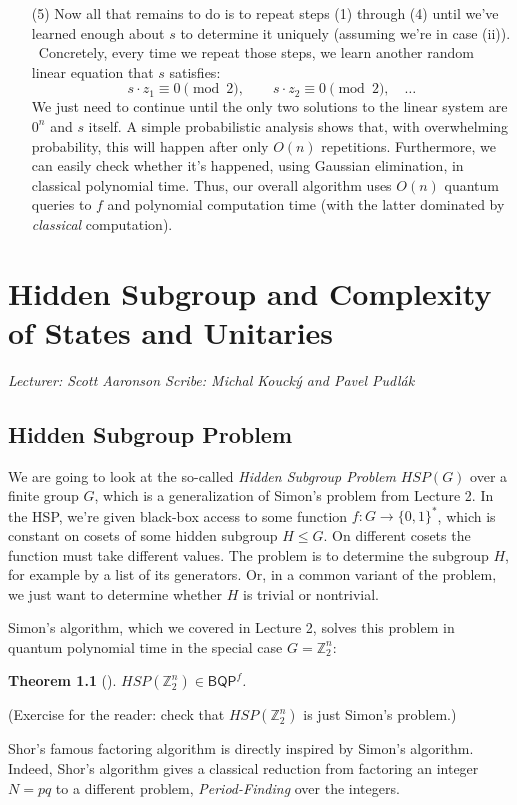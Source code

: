 \documentclass[12pt]{report}
\theoremstyle{plain}
\newtheorem{theorem}{Theorem}[section]
\theoremstyle{definition}
\newcommand{\Z}{{\mathbb Z}}
\newcommand{\lecture}[3]{%
  \chapter{#3}%
  \vspace{-5ex}%
  \textit{Lecturer: #1 \hfill Scribe: #2}\par%
  \vspace{1ex}\titlerule\vspace{2ex}}
\begin{document}
\begin{enumerate}
\item[(5)] Now all that remains to do is to repeat steps (1) through (4) until we've learned enough about $s$ to determine it uniquely (assuming we're in case (ii)). \ Concretely, every time we repeat those steps, we learn another random linear equation that $s$ satisfies:
    $$s\cdot z_1 \equiv 0 \pmod 2, \quad \quad s\cdot z_2 \equiv 0 \pmod 2, \quad \ldots$$
    We just need to continue until the only two solutions to the linear system are $0^n$ and $s$ itself. A simple probabilistic analysis shows that, with overwhelming probability, this will happen after only $O(n)$ repetitions. Furthermore, we can easily check whether it's happened, using Gaussian elimination, in classical polynomial time.  Thus, our overall algorithm uses $O(n)$ quantum queries to $f$ and polynomial computation time (with the latter dominated by {\em classical} computation).
\end{enumerate}


\lecture{Scott Aaronson}{Michal Kouck\'{y} and Pavel Pudl\'ak}{Hidden Subgroup and Complexity of States and Unitaries}

\section{Hidden Subgroup Problem}

We are going to look at the so-called {\em Hidden Subgroup Problem} $HSP(G)$ over a finite group $G$, which is a generalization of Simon's problem from Lecture 2.
In the HSP, we're given black-box
access to some function $f:G\rightarrow \{0,1\}^*$, which is constant on cosets of some hidden subgroup $H \le G$.
On different cosets the function must take different values. The problem is to determine the subgroup $H$, for example by a list of its generators.
Or, in a common variant of the problem, we just want to determine whether $H$ is trivial or nontrivial.

Simon's algorithm, which we covered in Lecture 2, solves this problem in quantum polynomial time in the special case $G=\Z^n_2$:

\begin{theorem}[\cite{simon}]
$HSP(\Z^n_2) \in \mathsf{BQP}^f$.
\end{theorem}

(Exercise for the reader: check that $HSP(\Z^n_2)$ is just Simon's problem.)

Shor's famous factoring algorithm is directly inspired by Simon's algorithm. Indeed, Shor's algorithm
gives a classical reduction from factoring an integer $N=pq$ to a different problem, {\em Period-Finding} over the integers.
\end{document}
